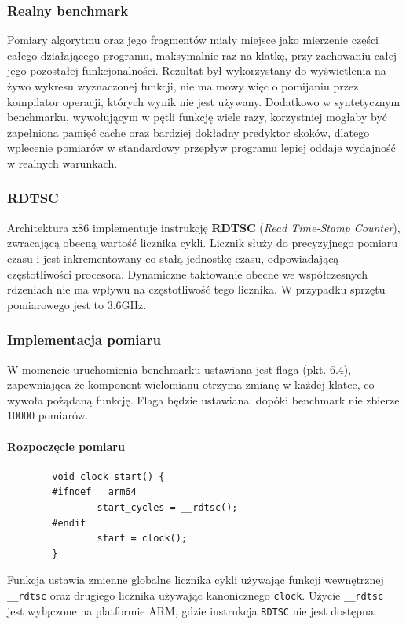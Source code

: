 \documentclass{article}
\begin{document}
	\subsubsection{Realny benchmark}
	Pomiary algorytmu oraz jego fragmentów miały miejsce jako mierzenie części całego działającego programu, maksymalnie raz na klatkę, przy zachowaniu całej jego pozostałej funkcjonalności. Rezultat był wykorzystany do wyświetlenia na żywo wykresu wyznaczonej funkcji, nie ma mowy więc o pomijaniu przez kompilator operacji, których wynik nie jest używany. Dodatkowo w syntetycznym benchmarku, wywołującym w pętli funkcję wiele razy, korzystniej mogłaby być zapełniona pamięć cache oraz bardziej dokładny predyktor skoków, dlatego wplecenie pomiarów w standardowy przepływ programu lepiej oddaje wydajność w realnych warunkach.
	
	\subsubsection{RDTSC}
	Architektura x86 implementuje instrukcję \textbf{RDTSC} (\textit{Read Time-Stamp Counter}), zwracającą obecną wartość licznika cykli. Licznik służy do precyzyjnego pomiaru czasu i jest inkrementowany co stałą jednostkę czasu, odpowiadającą częstotliwości procesora. Dynamiczne taktowanie obecne we współczesnych rdzeniach nie ma wpływu na częstotliwość tego licznika. W przypadku sprzętu pomiarowego jest to 3.6GHz.
	
	\subsubsection{Implementacja pomiaru}
	W momencie uruchomienia benchmarku ustawiana jest flaga (pkt. 6.4), zapewniająca że komponent wielomianu otrzyma zmianę w każdej klatce, co wywoła pożądaną funkcję. Flaga będzie ustawiana, dopóki benchmark nie zbierze 10000 pomiarów.
	
	\paragraph{Rozpoczęcie pomiaru}
	\begin{verbatim}
		void clock_start() {
		#ifndef __arm64
				start_cycles = __rdtsc();
		#endif
				start = clock();
		}
	\end{verbatim}
	Funkcja ustawia zmienne globalne licznika cykli używając funkcji wewnętrznej \verb|__rdtsc| oraz drugiego licznika używając kanonicznego \verb|clock|. Użycie \verb|__rdtsc| jest wyłączone na platformie ARM, gdzie instrukcja \verb|RDTSC| nie jest dostępna.\\
	
\end{document}
